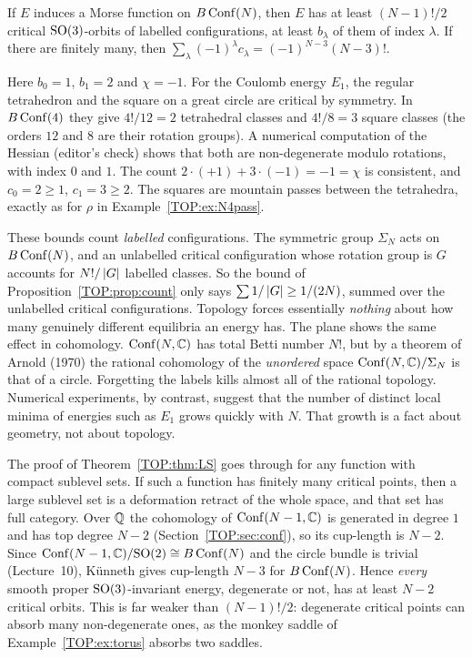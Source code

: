 \begin{proposition}\label{TOP:prop:count}
If $E$ induces a Morse function on $B\operatorname{Conf}(N)$, then $E$ has at least $(N-1)!/2$ critical $\mathrm{SO}(3)$-orbits
of labelled configurations, at least $b_\lambda$ of them of index $\lambda$. If there are finitely many,
then $\sum_\lambda(-1)^\lambda c_\lambda=(-1)^{N-3}(N-3)!$.
\end{proposition}

\begin{example}[$N=4$]\label{TOP:ex:N4morse}
Here $b_0=1$, $b_1=2$ and $\chi=-1$. For the Coulomb energy $E_1$, the regular tetrahedron and the square on a
great circle are critical by symmetry. In $B\operatorname{Conf}(4)$ they give $4!/12=2$ tetrahedral classes and
$4!/8=3$ square classes (the orders $12$ and $8$ are their rotation groups). A numerical computation of the
Hessian (editor's check) shows that both are non-degenerate modulo rotations, with index $0$ and $1$. The
count $2\cdot(+1)+3\cdot(-1)=-1=\chi$ is consistent, and $c_0=2\ge1$, $c_1=3\ge2$. The squares are
mountain passes between the tetrahedra, exactly as for $\rho$ in Example~\ref{TOP:ex:N4pass}.
\end{example}

\begin{remark}
These bounds count \emph{labelled} configurations. The symmetric group $\Sigma_N$ acts on $B\operatorname{Conf}(N)$, and
an unlabelled critical configuration whose rotation group is $G$ accounts for $N!/\left\lvert G \right\rvert$ labelled classes.
So the bound of Proposition~\ref{TOP:prop:count} only says $\sum 1/\left\lvert G \right\rvert\ge 1/(2N)$, summed over the
unlabelled critical configurations. Topology forces essentially \emph{nothing} about how many genuinely
different equilibria an energy has. The plane shows the same effect in cohomology. $\operatorname{Conf}(N,\mathbb{C})$ has total
Betti number $N!$, but by a theorem of Arnold (1970) the rational cohomology of the \emph{unordered} space
$\operatorname{Conf}(N,\mathbb{C})/\Sigma_N$ is that of a circle. Forgetting the labels kills almost all of the rational topology.
Numerical experiments, by contrast, suggest that the number of distinct local minima of energies such as
$E_1$ grows quickly with $N$. That growth is a fact about geometry, not about topology.
\end{remark}

\begin{remark}
The proof of Theorem~\ref{TOP:thm:LS} goes through for any function with compact sublevel sets. If such a
function has finitely many critical points, then a large sublevel set is a deformation retract of the whole
space, and that set has full category. Over $\mathbb{Q}$ the cohomology of $\operatorname{Conf}(N-1,\mathbb{C})$ is generated in degree
$1$ and has top degree $N-2$ (Section~\ref{TOP:sec:conf}), so its cup-length is $N-2$. Since
$\operatorname{Conf}(N-1,\mathbb{C})/\mathrm{SO}(2)\cong B\operatorname{Conf}(N)$ and the circle bundle is trivial (Lecture~10), K\"unneth gives
cup-length $N-3$ for $B\operatorname{Conf}(N)$. Hence \emph{every} smooth proper $\mathrm{SO}(3)$-invariant energy, degenerate or
not, has at least $N-2$ critical orbits. This is far weaker than $(N-1)!/2$: degenerate critical points can
absorb many non-degenerate ones, as the monkey saddle of Example~\ref{TOP:ex:torus} absorbs two saddles.
\end{remark}

